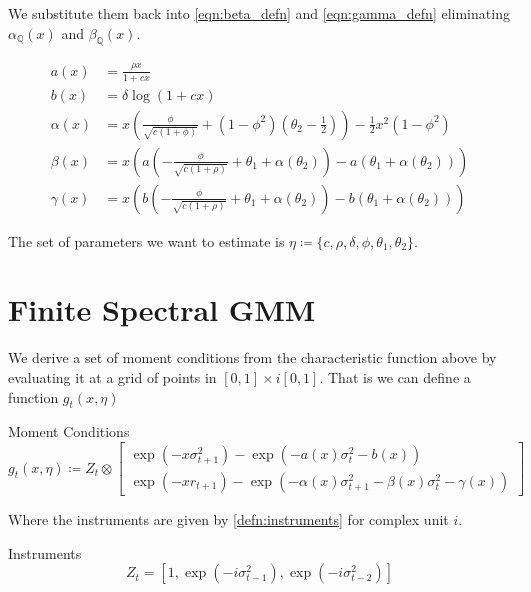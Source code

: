 \documentclass[11pt]{article}
\newcommand*{\Q}{\mathbb{Q}}
\begin{document}
We substitute them back into \cref{eqn:beta_defn} and \cref{eqn:gamma_defn} eliminating $\alpha_{\Q}(x)$ and
$\beta_{\Q}(x)$.

\begin{align}
    a(x) &= \frac{\rho x}{1 + c x} \\ \label{eqn:a(x)}
    b(x) &= \delta \log \left(1 + c x\right) \\ \label{eqn:b(x)}
    \alpha(x) &= x \left(\frac{\phi}{\sqrt{c (1 + \phi)}}  + (1 - \phi^2)\left(\theta_2 - \frac{1}{2}\right)\right)
    - \frac{1}{2} x^2 (1 - \phi^2) \\ \label{eqn:alpha(x)}
    \beta(x)  &= x \left(a\left(-\frac{\phi}{\sqrt{c(1+ \rho)}} + \theta_1 + \alpha(\theta_2)\right) -
        a\left(\theta_1 + \alpha(\theta_2)\right)\right) \\ 
        \label{eqn:beta(x)}
    \gamma(x) &= x \left(b\left(-\frac{\phi}{\sqrt{c(1+\rho)}} + \theta_1 + \alpha(\theta_2)\right) -
        b\left(\theta_1 + \alpha(\theta_2)\right) \right)
\end{align}


The set of parameters we want to estimate is $\eta \coloneqq \lbrace c, \rho, \delta, \phi, \theta_1,
\theta_2\rbrace$.

\section{Finite Spectral GMM}
\label{sec:spectral_GMM}

We derive a set of moment conditions from the characteristic function above by evaluating it at a grid of points
in $[0,1] \times i [0,1]$. 
That is we can define a function $g_t(x, \eta)$

\begin{defn}{Moment Conditions}
    \begin{equation}
        g_t(x, \eta) \coloneqq Z_t \otimes \begin{bmatrix} \exp(- x \sigma^2_{t+1}) - \exp\left( - a(x) \sigma_t^2
        - b(x) \right) \\ \exp\left(- x r_{t+1}\right) - \exp\left(- \alpha(x) \sigma^2_{t+1} - \beta(x)
        \sigma^2_t - \gamma(x)\right) \end{bmatrix}
    \end{equation}
\end{defn}

Where the instruments are given by \cref{defn:instruments} for complex unit $i$. 

\begin{defn}{Instruments}
    \label{defn:instruments}
    \begin{equation}
        Z_t = \left[1, \exp\left(- i \sigma_{t-1}^2\right), \exp\left(-i \sigma^2_{t-2}\right)\right] 
    \end{equation}
\end{defn}
\end{document}
